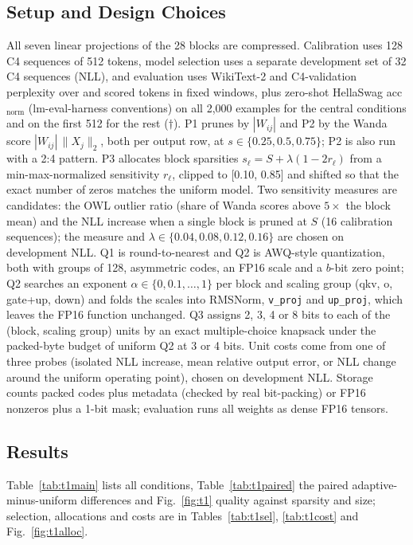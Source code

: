 \documentclass{article}
\begin{document}
\subsection{Setup and Design Choices}
All seven linear projections of the 28 blocks are compressed. Calibration uses 128 C4 sequences of 512 tokens, model selection uses a separate development set of 32 C4 sequences
(NLL), and evaluation uses WikiText-2 and C4-validation perplexity over \TOneWikiN{} and \TOneCFourN{} scored tokens in
fixed windows, plus zero-shot HellaSwag acc$_{\text{norm}}$ (lm-eval-harness conventions) on all 2,000 examples for the
central conditions and on the first 512 for the rest ($\dagger$). P1 prunes by $|W_{ij}|$ and P2 by the Wanda score
$|W_{ij}|\,\|X_j\|_2$, both per output row, at $s\in\{0.25,0.5,0.75\}$; P2 is also run with a 2:4 pattern. P3 allocates
block sparsities $s_\ell=S+\lambda(1-2r_\ell)$ from a min-max-normalized sensitivity $r_\ell$, clipped to [0.10, 0.85] and
shifted so that the exact number of zeros matches the uniform model. Two sensitivity measures are candidates: the OWL
outlier ratio (share of Wanda scores above $5\times$ the block mean) and the NLL increase when a single block is pruned
at $S$ (16 calibration sequences); the measure and $\lambda\in\{0.04,0.08,0.12,0.16\}$ are chosen on development NLL.
Q1 is round-to-nearest and Q2 is AWQ-style quantization, both with groups of 128, asymmetric codes, an FP16 scale and a
$b$-bit zero point; Q2 searches an exponent $\alpha\in\{0,0.1,\dots,1\}$ per block and scaling group (qkv, o, gate+up,
down) and folds the scales into RMSNorm, \texttt{v\_proj} and \texttt{up\_proj}, which leaves the FP16 function unchanged.
Q3 assigns 2, 3, 4 or 8 bits to each of the \TOneQThreeUnits{} (block, scaling group) units by an exact multiple-choice
knapsack under the packed-byte budget of uniform Q2 at 3 or 4 bits. Unit costs come from one of three probes (isolated
NLL increase, mean relative output error, or NLL change around the uniform operating point), chosen on development NLL.
Storage counts packed codes plus metadata (checked by real bit-packing) or FP16 nonzeros plus a 1-bit mask;
evaluation runs all weights as dense FP16 tensors.

\subsection{Results}
Table~\ref{tab:t1main} lists all conditions, Table~\ref{tab:t1paired} the paired adaptive-minus-uniform differences and
Fig.~\ref{fig:t1} quality against sparsity and size; selection, allocations and costs are in Tables~\ref{tab:t1sel},
\ref{tab:t1cost} and Fig.~\ref{fig:t1alloc}.
\end{document}
